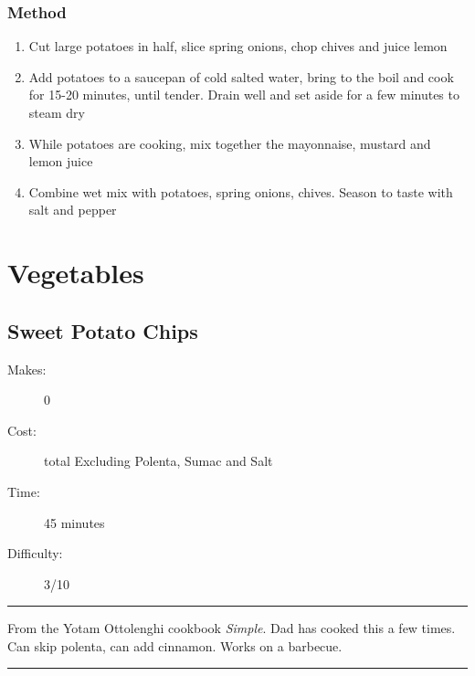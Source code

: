 \documentclass[]{article}
\begin{document}
\subsubsection*{\Large Method}
\begin{enumerate}[font=\huge\color{accent}]
	\item Cut large potatoes in half, slice spring onions, chop chives and juice lemon
	\item Add potatoes to a saucepan of cold salted water, bring to the boil and cook for 15-20 minutes, until tender. Drain well and set aside for a few minutes to steam dry
	\item While potatoes are cooking, mix together the mayonnaise, mustard and lemon juice
	\item Combine wet mix with potatoes, spring onions, chives. Season to taste with salt and pepper
\end{enumerate}
\newpage
{}
\section*{\center\Huge\color{accent}Vegetables}
\label{cat:Vegetables}
\label{rec:Sweet Potato Chips}
\subsection*{\center\huge Sweet Potato Chips}
\begin{description}
\item[Makes:] 0 
\item[Cost:]  total Excluding Polenta, Sumac and Salt
\item[Time:] 45 minutes
\item[Difficulty:] 3/10
\end{description}
\vspace{0.2cm}\hrule\vspace{0.5cm}
\begin{adjustwidth}{0.5 cm}{0.5 cm}

From the Yotam Ottolenghi cookbook \textit{Simple}. Dad has cooked this a few times. Can skip polenta, can add cinnamon. Works on a barbecue. \hfill\color{accent}{\Large\faVimeoSquare\hspace{0.1cm}\faTruck\hspace{0.1cm}}\color{black}

\end{adjustwidth}
\vspace{0.5cm}\hrule
\end{document}

